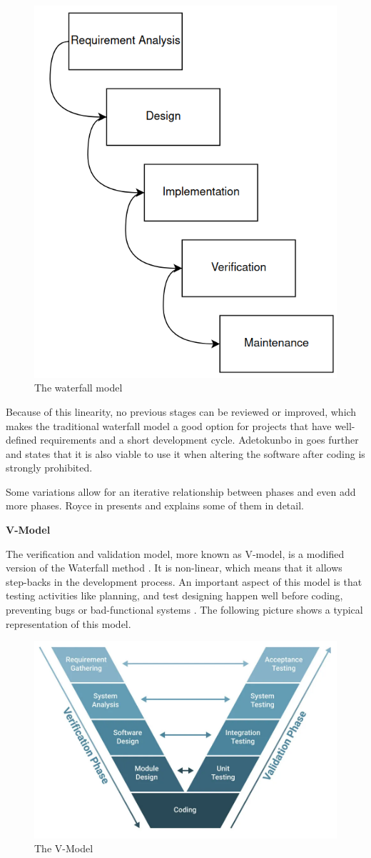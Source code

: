 \begin{figure}[H]
	\centering
 	\includegraphics[width=0.4\linewidth]{Images/Waterfall.png}
 	\caption{The waterfall model}
	 \label{fig_Waterfall}
\end{figure}

Because of this linearity, no previous stages can be reviewed or improved, which makes the traditional waterfall model a good option for projects 
that have well-defined requirements and a short development cycle. Adetokunbo in \cite{waterfallModel} goes further and states that it is also 
viable to use it when altering the software after coding is strongly prohibited.

Some variations allow for an iterative relationship between phases and even add more phases. Royce in \cite{royce1970winston} presents and 
explains some of them in detail. 
\newline

\textbf{V-Model}
\newline

The verification and validation model, more known as V-model, is a modified version of the Waterfall method \cite{V-model}. It is non-linear, 
which means that it allows step-backs in the development process. An important aspect of this model is that testing activities like planning, and 
test designing happen well before coding, preventing bugs or bad-functional systems \cite{V-model2}. The following picture shows a typical 
representation of this model.

\begin{figure}[H]
	\centering
 	\includegraphics[width=0.5\linewidth]{Images/V-Model.png}
 	\caption{The V-Model}
	 \label{fig_V-Model}
\end{figure}

